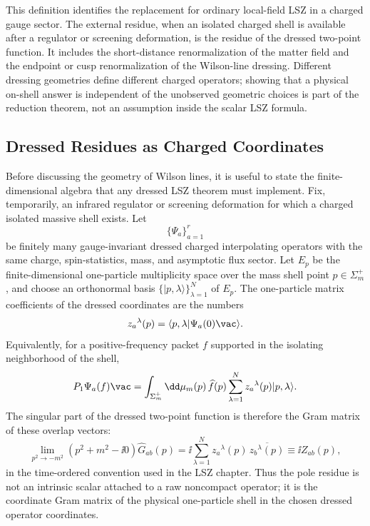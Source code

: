 This definition identifies the replacement for ordinary local-field LSZ in a
charged gauge sector.  The external residue, when an isolated charged shell is
available after a regulator or screening deformation, is the residue of the
dressed two-point function.  It includes the short-distance renormalization of
the matter field and the endpoint or cusp renormalization of the Wilson-line
dressing.  Different dressing geometries define different charged operators;
showing that a physical on-shell answer is independent of the unobserved
geometric choices is part of the reduction theorem, not an assumption inside
the scalar LSZ formula.

\subsection{Dressed Residues as Charged Coordinates}

Before discussing the geometry of Wilson lines, it is useful to state the
finite-dimensional algebra that any dressed LSZ theorem must implement.  Fix,
temporarily, an infrared regulator or screening deformation for which a
charged isolated massive shell exists.  Let
\[
  \{\Psi_a\}_{a=1}^r
\]
be finitely many gauge-invariant dressed charged interpolating operators with
the same charge, spin-statistics, mass, and asymptotic flux sector.  Let
\(E_p\) be the finite-dimensional one-particle multiplicity space over the
mass shell point \(p\in\Sigma_m^+\), and choose an orthonormal basis
\(\{|p,\lambda\rangle\}_{\lambda=1}^{N}\) of \(E_p\).  The one-particle
matrix coefficients of the dressed coordinates are the numbers
\[
  z_a{}^\lambda(p)
  =
  \langle p,\lambda|\Psi_a(0)\vac\rangle .
\]
Equivalently, for a positive-frequency packet \(f\) supported in the
isolating neighborhood of the shell,
\[
  P_1\Psi_a(f)\vac
  =
  \int_{\Sigma_m^+}\dd\mu_m(p)\,\widehat f(p)
  \sum_{\lambda=1}^{N}z_a{}^\lambda(p)|p,\lambda\rangle .
\]
The singular part of the dressed two-point function is therefore the
Gram matrix of these overlap vectors:
\begin{equation}
  \lim_{p^2\to -m^2}
  (p^2+m^2-\ii0)\widehat G_{ab}(p)
  =
  \ii\sum_{\lambda=1}^{N}
  z_a{}^\lambda(p)\,\overline{z_b{}^\lambda(p)}
  \equiv \ii Z_{ab}(p),
  \label{eq:dressed-lsz-residue-gram-coordinate}
\end{equation}
in the time-ordered convention used in the LSZ chapter.  Thus the pole
residue is not an intrinsic scalar attached to a raw noncompact operator; it
is the coordinate Gram matrix of the physical one-particle shell in the
chosen dressed operator coordinates.

